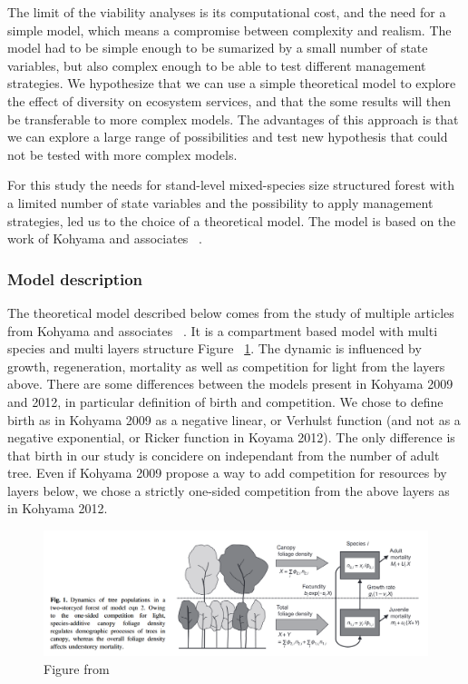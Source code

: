 \documentclass{article}
\begin{document}
The limit of the viability analyses is its computational cost, and the need for a simple model, which means a compromise between complexity and realism. The model had to be simple enough to be sumarized by a small number of state variables, but also complex enough to be able to test different management strategies. We hypothesize that we can use a simple theoretical model to explore the effect of diversity on ecosystem services, and that the some results will then be transferable to more complex models. The advantages of this approach is that we can explore a large range of possibilities and test new hypothesis that could not be tested with more complex models.

For this study the needs for stand-level mixed-species size structured forest with a limited number of state variables and the possibility to apply management strategies, led us to the choice of a theoretical model. The model is based on the work of Kohyama and associates ~\autocite{kohyamaStratificationTheoryPlant2009, kohyamaOnesidedCompetitionLight2012}.

\subsubsection{Model description}

The theoretical model described below comes from the study of multiple articles from Kohyama and associates ~\autocite{kohyamaStratificationTheoryPlant2009, kohyamaOnesidedCompetitionLight2012}.
It is a compartment based model with multi species and multi layers structure Figure ~\ref{fig:fig_model}. The dynamic is influenced by growth, regeneration, mortality as well as competition for light from the layers above. There are some differences between the models present in Kohyama 2009 and 2012, in particular definition of birth and competition. We chose to define birth as in Kohyama 2009 as a negative linear, or Verhulst function (and not as a negative exponential, or Ricker function in Koyama 2012). The only difference is that birth in our study is concidere on independant from the number of adult tree. Even if Kohyama 2009 propose a way to add competition for resources by layers below, we chose a strictly one-sided competition from the above layers as in Kohyama 2012.

\begin{figure}[h]
    \centering
    \includegraphics[width=\textwidth]{Figure/Fig_model_Kohyama.png}
    \caption{Figure from ~\autocite{kohyamaOnesidedCompetitionLight2012}}
    \label{fig:fig_model}
\end{figure}
\end{document}
